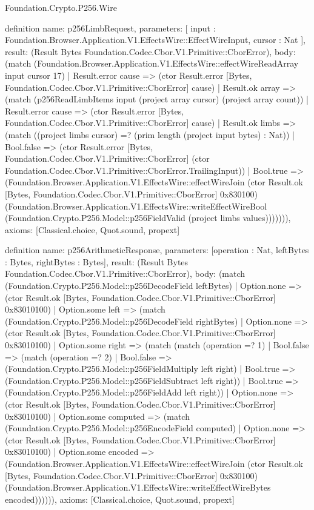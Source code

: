 \begin{lexlean}{Foundation.Crypto.P256.Wire}
\begin{semanticmodule}
definition{
  name: p256LimbRequest,
  parameters: [
    input : Foundation.Browser.Application.V1.EffectsWire::EffectWireInput,
    cursor : Nat
  ],
  result: (Result Bytes Foundation.Codec.Cbor.V1.Primitive::CborError),
  body: (match (Foundation.Browser.Application.V1.EffectsWire::effectWireReadArray input cursor 17)
    | Result.error cause => (ctor Result.error [Bytes, Foundation.Codec.Cbor.V1.Primitive::CborError] cause)
    | Result.ok array => (match (p256ReadLimbItems input (project array cursor) (project array count))
      | Result.error cause => (ctor Result.error [Bytes, Foundation.Codec.Cbor.V1.Primitive::CborError] cause)
      | Result.ok limbs => (match ((project limbs cursor) =? (prim length (project input bytes) : Nat))
        | Bool.false => (ctor Result.error [Bytes, Foundation.Codec.Cbor.V1.Primitive::CborError] (ctor Foundation.Codec.Cbor.V1.Primitive::CborError.TrailingInput))
        | Bool.true => (Foundation.Browser.Application.V1.EffectsWire::effectWireJoin (ctor Result.ok [Bytes, Foundation.Codec.Cbor.V1.Primitive::CborError] 0x830100) (Foundation.Browser.Application.V1.EffectsWire::writeEffectWireBool (Foundation.Crypto.P256.Model::p256FieldValid (project limbs values))))))),
  axioms: [Classical.choice, Quot.sound, propext]
}

definition{
  name: p256ArithmeticResponse,
  parameters: [operation : Nat, leftBytes : Bytes, rightBytes : Bytes],
  result: (Result Bytes Foundation.Codec.Cbor.V1.Primitive::CborError),
  body: (match (Foundation.Crypto.P256.Model::p256DecodeField leftBytes)
    | Option.none => (ctor Result.ok [Bytes, Foundation.Codec.Cbor.V1.Primitive::CborError] 0x83010100)
    | Option.some left => (match (Foundation.Crypto.P256.Model::p256DecodeField rightBytes)
      | Option.none => (ctor Result.ok [Bytes, Foundation.Codec.Cbor.V1.Primitive::CborError] 0x83010100)
      | Option.some right => (match (match (operation =? 1)
          | Bool.false => (match (operation =? 2)
            | Bool.false => (Foundation.Crypto.P256.Model::p256FieldMultiply left right)
            | Bool.true => (Foundation.Crypto.P256.Model::p256FieldSubtract left right))
          | Bool.true => (Foundation.Crypto.P256.Model::p256FieldAdd left right))
        | Option.none => (ctor Result.ok [Bytes, Foundation.Codec.Cbor.V1.Primitive::CborError] 0x83010100)
        | Option.some computed => (match (Foundation.Crypto.P256.Model::p256EncodeField computed)
          | Option.none => (ctor Result.ok [Bytes, Foundation.Codec.Cbor.V1.Primitive::CborError] 0x83010100)
          | Option.some encoded => (Foundation.Browser.Application.V1.EffectsWire::effectWireJoin (ctor Result.ok [Bytes, Foundation.Codec.Cbor.V1.Primitive::CborError] 0x830100) (Foundation.Browser.Application.V1.EffectsWire::writeEffectWireBytes encoded)))))),
  axioms: [Classical.choice, Quot.sound, propext]
}


\end{semanticmodule}
\end{lexlean}
